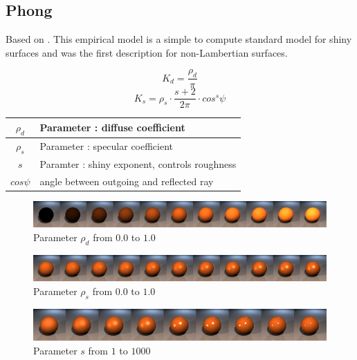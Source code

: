 \documentclass[11pt,a4paper]{article}
\begin{document}
\newpage
\subsection{Phong}
Based on \cite{Pho75}. This empirical model is a simple to compute standard model for shiny surfaces and was the first description for non-Lambertian surfaces.

\begin{equation}
K_d = \frac{\rho_d}{\pi}
\end{equation}
\begin{equation}
K_s = \rho_s \cdot \frac{s+2}{2\pi} \cdot cos^s\psi
\end{equation}

\begin{table}[H]
\begin{tabular}{| c | l |}
\hline
$\rho_d$ & Parameter : diffuse coefficient\\ \hline
$\rho_s$ & Parameter : specular coefficient\\ \hline
$s$ & Paramter : shiny exponent, controls roughness\\ \hline
$cos\psi$ & angle between outgoing and reflected ray\\ \hline
\end{tabular}
\end{table}


\begin{figure}[H]

\includegraphics[width=\textwidth]{phongdiffcomplete.png}
\caption{Parameter $\rho_d$ from $0.0$ to $1.0$}
\end{figure}

\begin{figure}[H]

\includegraphics[width=\textwidth]{phongspeccomplete.png}
\caption{Parameter $\rho_s$ from $0.0$ to $1.0$}
\end{figure}

\begin{figure}[H]

\includegraphics[width=\textwidth]{phongshinecomplete.png}
\caption{Parameter $s$ from $1$ to $1000$}
\end{figure}
\end{document}
